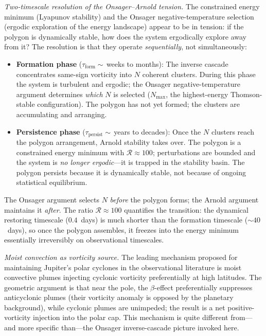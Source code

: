 \emph{Two-timescale resolution of the Onsager--Arnold tension.}
The constrained energy minimum (Lyapunov stability) and the Onsager
negative-temperature selection (ergodic exploration of the energy
landscape) appear to be in tension: if the polygon is dynamically
stable, how does the system ergodically explore away from it?
The resolution is that they operate \emph{sequentially}, not
simultaneously:
\begin{itemize}
  \item \textbf{Formation phase}
    ($\tau_{\mathrm{form}} \sim$\,weeks to months):
    The inverse cascade concentrates same-sign vorticity into $N$
    coherent clusters.  During this phase the system is turbulent
    and ergodic; the Onsager negative-temperature argument determines
    \emph{which} $N$ is selected ($N_{\max}$, the highest-energy
    Thomson-stable configuration).  The polygon has not yet formed;
    the clusters are accumulating and arranging.
  \item \textbf{Persistence phase}
    ($\tau_{\mathrm{persist}} \sim$\,years to decades):
    Once the $N$ clusters reach the polygon arrangement, Arnold
    stability takes over.  The polygon is a constrained energy
    minimum with $\mathcal{R} \approx 100$; perturbations are
    bounded and the system is \emph{no longer ergodic}---it is
    trapped in the stability basin.  The polygon persists because
    it is dynamically stable, not because of ongoing statistical
    equilibrium.
\end{itemize}
The Onsager argument selects $N$ \emph{before} the polygon forms;
the Arnold argument maintains it \emph{after}.  The ratio
$\mathcal{R} \approx 100$ quantifies the transition: the dynamical
restoring timescale ($0.4$~days) is much shorter than the formation
timescale ($\sim\!40$~days), so once the polygon assembles, it
freezes into the energy minimum essentially irreversibly on
observational timescales.

\emph{Moist convection as vorticity source.}
The leading mechanism proposed for maintaining Jupiter's polar cyclones
in the observational literature \citep{ONeill2015} is moist convective
plumes injecting cyclonic vorticity preferentially at high latitudes.
The geometric argument is that near the pole, the $\beta$-effect
preferentially suppresses anticyclonic plumes (their vorticity anomaly
is opposed by the planetary background), while cyclonic plumes are
unimpeded; the result is a net positive-vorticity injection into the
polar cap.  This mechanism is quite different from---and more specific
than---the Onsager inverse-cascade picture invoked here.

